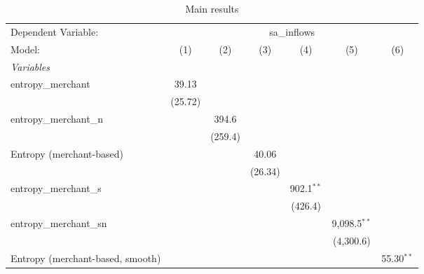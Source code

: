 
\begin{table}[htbp]
   \centering
   \caption{\label{tab:reg_sa_inflows_merchant.tex} Main results}
   \begin{footnotesize}
      \begin{tabular}{lcccccc}
         \tabularnewline\midrule\midrule
         Dependent Variable: & \multicolumn{6}{c}{sa\_inflows}\\
         Model:                           & (1)            & (2)            & (3)            & (4)            & (5)            & (6)\\
         \midrule \emph{Variables} &   &   &   &   &   &  \\
         entropy\_merchant               & 39.13          &                &                &                &                &   \\
                                          & (25.72)        &                &                &                &                &   \\
         entropy\_merchant\_n           &                & 394.6          &                &                &                &   \\
                                          &                & (259.4)        &                &                &                &   \\
         Entropy (merchant-based)         &                &                & 40.06          &                &                &   \\
                                          &                &                & (26.34)        &                &                &   \\
         entropy\_merchant\_s           &                &                &                & 902.1$^{**}$   &                &   \\
                                          &                &                &                & (426.4)        &                &   \\
         entropy\_merchant\_sn          &                &                &                &                & 9,098.5$^{**}$ &   \\
                                          &                &                &                &                & (4,300.6)      &   \\
         Entropy (merchant-based, smooth) &                &                &                &                &                & 55.30$^{**}$\\

\end{tabular}
\end{footnotesize}
\end{table}
